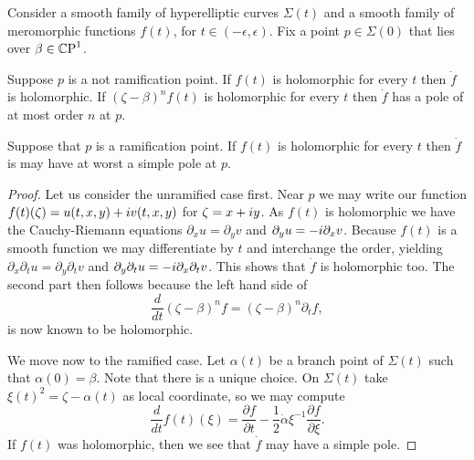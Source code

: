 \documentclass{article}
\begin{document}
\begin{lem}\label{lem:pole order}
Consider a smooth family of hyperelliptic curves $\Sigma(t)$ and 
a smooth family of meromorphic functions $f(t)$, for $t\in(-\epsilon,\epsilon)$.
Fix a point $p\in\Sigma(0)$ that lies over $\beta \in \mathbb{C}\text{P}^1$.

Suppose $p$ is a not ramification point. If $f(t)$ is holomorphic for every $t$ then $\dot{f}$ is holomorphic. If ${(\zeta - \beta)}^n f(t)$ is holomorphic for every $t$ then $\dot{f}$ has a pole of at most order $n$ at $p$. 

Suppose that $p$ is a ramification point. If $f(t)$ is holomorphic for every $t$ then $\dot{f}$ is may have at worst a simple pole at $p$.

\begin{proof}
Let us consider the unramified case first. Near $p$ we may write our function $f(t)(\zeta) = u(t,x,y) + i v(t,x,y)$ for $\zeta = x + i y$. As $f(t)$ is holomorphic we have the Cauchy-Riemann equations $\partial_x u = \partial_y v$ and $\partial_y u = -i \partial_x v$. Because $f(t)$ is a smooth function we may differentiate by $t$ and interchange the order, yielding $\partial_x\partial_t u = \partial_y\partial_t v$ and $\partial_y\partial_t u = -i \partial_x\partial_t v$. This shows that $\dot{f}$ is holomorphic too. The second part then follows because the left hand side of
\[
\frac{d}{d t}{(\zeta - \beta)}^n f = {(\zeta - \beta)}^n \partial_t f,
\]
is now known to be holomorphic.

We move now to the ramified case. Let $\alpha(t)$ be a branch point of $\Sigma(t)$ such that $\alpha(0)=\beta$. Note that there is a unique choice. On $\Sigma(t)$ take $\xi(t)^2 = \zeta - \alpha(t)$ as local coordinate, so we may compute
\[
\frac{d}{dt}f(t)(\xi)
= \frac{\partial f}{\partial t} - \frac{1}{2}\dot{\alpha}\xi^{-1}\frac{\partial f}{\partial\xi}.
\]
If $f(t)$ was holomorphic, then we see that $\dot{f}$ may have a simple pole. 
\end{proof}
\end{lem}
\end{document}
